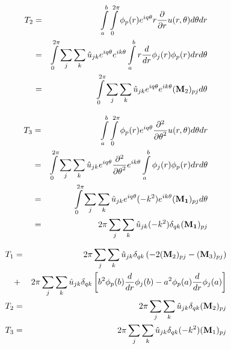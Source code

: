 \begin{eqnarray}
T_2 &=& \int_a^b \int_0^{2\pi} \phi_p(r) e^{iq\theta} r \frac{\partial}{\partial r} u(r,\theta) d\theta dr \\
    &=& \int_0^{2\pi} \sum_j \sum_k \hat{u}_{jk} e^{iq\theta} e^{ik\theta} \int_a^b r \frac{d}{dr} \phi_j(r) \phi_p(r) dr d\theta\\
    &=& \int_0^{2\pi} \sum_j \sum_k \hat{u}_{jk} e^{iq\theta} e^{ik\theta} ({\bf M}_2)_{pj} d\theta\\
\end{eqnarray}

\begin{eqnarray}
T_3 &=& \int_a^b \int_0^{2\pi} \phi_p(r) e^{iq\theta} \frac{\partial^2}{{\partial \theta}^2} u(r,\theta) d\theta dr \\
    &=& \int_0^{2\pi} \sum_j \sum_k \hat{u}_{jk} e^{iq\theta} \frac{\partial^2}{{\partial \theta}^2} e^{ik\theta} \int_a^b \phi_j(r) \phi_p(r) dr d\theta\\
    &=& \int_0^{2\pi} \sum_j \sum_k \hat{u}_{jk} e^{iq\theta} (-k^2) e^{ik\theta} ({\bf M_1})_{pj} d\theta\\
    &=& 2\pi \sum_j \sum_k \hat{u}_{jk} (-k^2) \delta_{qk} ({\bf M_1})_{pj}
\end{eqnarray}

\begin{eqnarray}
T_1 &=& 2\pi \sum_j \sum_k \hat{u}_{jk} \delta_{qk} \left(- 2 ({\bf M}_2)_{pj} - ({\bf M}_3)_{pj} \right) \\
    &+& 2\pi \sum_j \sum_k \hat{u}_{jk} \delta_{qk} \left[ b^2\phi_p(b)\frac{d}{dr}\phi_j(b) - a^2\phi_p(a)\frac{d}{dr}\phi_j(a) \right] \\
T_2 &=& 2\pi \sum_j \sum_k \hat{u}_{jk} \delta_{qk} ({\bf M}_2)_{pj} \\
T_3 &=& 2\pi \sum_j \sum_k \hat{u}_{jk} \delta_{qk} (-k^2) ({\bf M}_1)_{pj}
\end{eqnarray}



